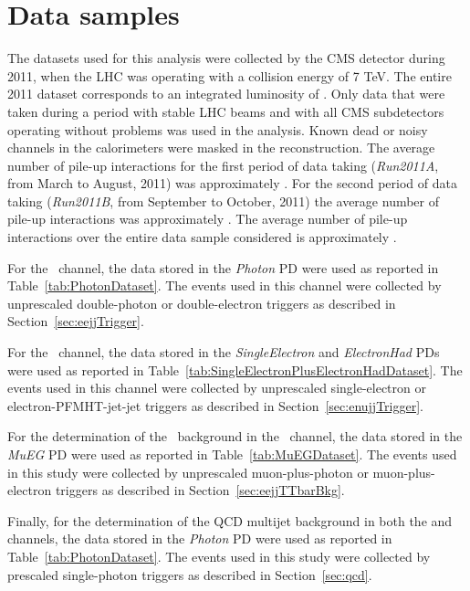 \section{Data samples}
\label{sec:data-samples}

The datasets used for this analysis were collected by the CMS detector during 2011, when
the LHC was operating with a collision energy of 7 TeV.  The entire 2011 dataset
corresponds to an  integrated luminosity of \lumi. 
Only data that were taken during a period with stable
LHC beams and with all CMS subdetectors operating without problems was used in the analysis.
Known dead or noisy channels in the calorimeters were masked in the reconstruction.
The average number of pile-up interactions for the first period of data 
taking ({\it Run2011A}, from March to August, 2011) was approximately \NpileupA.
For the second period of data taking ({\it Run2011B}, from September to October, 2011) the average
number of pile-up interactions was approximately \NpileupB. 
The average number of pile-up interactions over the entire 
data sample considered is approximately \Npileup.

For the \eejj~channel, the data stored in the {\it Photon} PD
were used as reported in Table~\ref{tab:PhotonDataset}. The events used in this channel  
were collected by unprescaled double-photon or double-electron triggers as described in 
Section~\ref{sec:eejjTrigger}.

For the \enujj~channel, the data stored in the {\it SingleElectron} and 
{\it ElectronHad}  PDs were used as reported in Table~\ref{tab:SingleElectronPlusElectronHadDataset}. 
The events used in this channel were collected by unprescaled  single-electron or 
electron-PFMHT-jet-jet triggers as described in Section~\ref{sec:enujjTrigger}.

For the determination of the \ttbar~background in the \eejj~channel, the data stored in the {\it MuEG} PD
were used as reported in Table~\ref{tab:MuEGDataset}. The events used in this study  
were collected by unprescaled muon-plus-photon or muon-plus-electron triggers as described 
in Section~\ref{sec:eejjTTbarBkg}.

Finally, for the determination of the QCD multijet background in both the \eejj and \enujj channels, 
the data stored in the {\it Photon} PD were used as reported in Table~\ref{tab:PhotonDataset}. 
The events used in this study were collected by prescaled single-photon triggers as 
described in Section~\ref{sec:qcd}.

